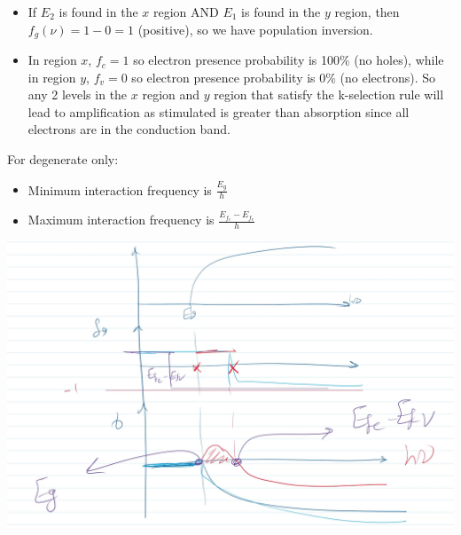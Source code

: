 \documentclass[11pt]{article}
\begin{document}
\begin{itemize}
    \item If $E_2$ is found in the $x$ region AND $E_1$ is found in the $y$ region, then $f_g (\nu) = 1 - 0 = 1$ (positive), so we have population inversion.
    \item In region $x$, $f_c = 1$ so electron presence probability is 100\% (no holes), while in region $y$, $f_v = 0$ so electron presence probability is 0\% (no electrons). So any 2 levels in the $x$ region and $y$ region that satisfy the k-selection rule will lead to amplification as stimulated is greater than absorption since all electrons are in the conduction band.
\end{itemize}
For degenerate only:
\begin{itemize}
    \item Minimum interaction frequency is $\frac{E_g}{h}$
    \item Maximum interaction frequency is $\frac{E_{f_c} - E_{f_v}}{h}$
\end{itemize}
\begin{center}
    \includegraphics[scale=0.6]{11.png}
\end{center}
\end{document}
